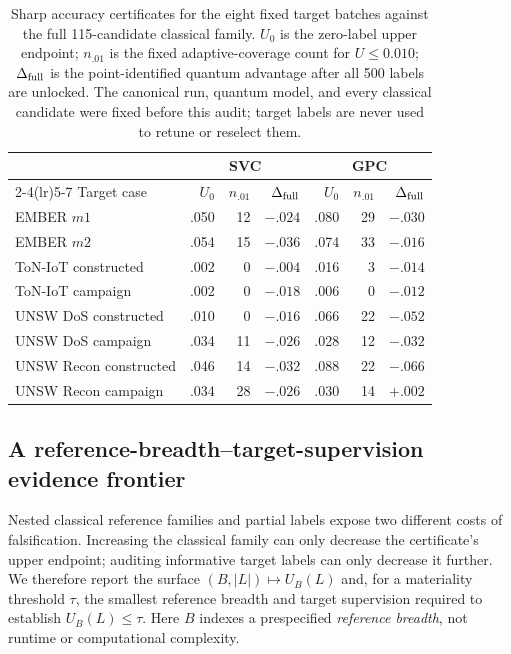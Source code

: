 \documentclass[referee,lineno,pdflatex,sn-nature]{sn-jnl}
\theoremstyle{thmstyleone}%
\theoremstyle{thmstyletwo}%
\theoremstyle{thmstylethree}%
\begin{document}
\begin{table}[t]
\centering
\caption{Sharp accuracy certificates for the eight fixed target batches against the full 115-candidate classical family. $U_0$ is the zero-label upper endpoint; $n_{.01}$ is the fixed adaptive-coverage count for $U\leq0.010$; $\Delta_{\rm full}$ is the point-identified quantum advantage after all 500 labels are unlocked. The canonical run, quantum model, and every classical candidate were fixed before this audit; target labels are never used to retune or reselect them.}
\label{tab:v9_certificate}
\scriptsize
\setlength{\tabcolsep}{4pt}
\begin{tabular}{@{}lrrr@{\qquad}rrr@{}}
\toprule
& \multicolumn{3}{c}{SVC} & \multicolumn{3}{c}{GPC}\\
\cmidrule(lr){2-4}\cmidrule(lr){5-7}
Target case & $U_0$ & $n_{.01}$ & $\Delta_{\rm full}$ &
$U_0$ & $n_{.01}$ & $\Delta_{\rm full}$\\
\midrule
EMBER $m1$                 & .050 & 12 & $-.024$ & .080 & 29 & $-.030$\\
EMBER $m2$                 & .054 & 15 & $-.036$ & .074 & 33 & $-.016$\\
ToN-IoT constructed        & .002 &  0 & $-.004$ & .016 &  3 & $-.014$\\
ToN-IoT campaign           & .002 &  0 & $-.018$ & .006 &  0 & $-.012$\\
UNSW DoS constructed       & .010 &  0 & $-.016$ & .066 & 22 & $-.052$\\
UNSW DoS campaign          & .034 & 11 & $-.026$ & .028 & 12 & $-.032$\\
UNSW Recon constructed     & .046 & 14 & $-.032$ & .088 & 22 & $-.066$\\
UNSW Recon campaign        & .034 & 28 & $-.026$ & .030 & 14 & $+.002$\\
\bottomrule
\end{tabular}
\end{table}

\subsection{A reference-breadth--target-supervision evidence frontier}
\label{sec:res_frontier}

Nested classical reference families and partial labels expose two different costs of falsification. Increasing the classical family can only decrease the certificate's upper endpoint; auditing informative target labels can only decrease it further. We therefore report the surface $(B,|L|)\mapsto U_B(L)$ and, for a materiality threshold $\tau$, the smallest reference breadth and target supervision required to establish $U_B(L)\leq\tau$. Here $B$ indexes a prespecified \emph{reference breadth}, not runtime or computational complexity.
\end{document}
